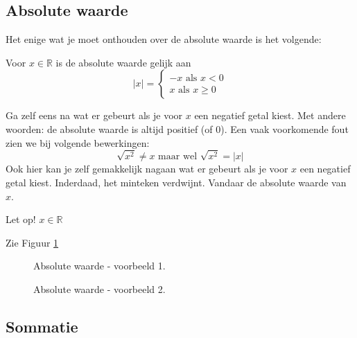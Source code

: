\subsection{Absolute waarde}
Het enige wat je moet onthouden over de absolute waarde is het volgende:

\begin{definitie}
	Voor $x \in \mathbb{R}$ is de absolute waarde gelijk aan 
	\begin{equation*}
	|x| = \begin{cases}
	-x \text{ als } x<0 \\
	x \text{ als } x\ge 0 
	\end{cases}
	\end{equation*}
\end{definitie}

Ga zelf eens na wat er gebeurt als je voor $x$ een negatief getal kiest.
Met andere woorden: de absolute waarde is altijd positief (of 0).
Een vaak voorkomende fout zien we bij volgende bewerkingen:
\begin{equation*}
\sqrt{x^2}\ne x \text{ maar wel } \sqrt{x^2}=|x|
\end{equation*}
Ook hier kan je zelf gemakkelijk nagaan wat er gebeurt als je voor $x$ een negatief getal kiest. Inderdaad, het minteken verdwijnt. Vandaar de absolute waarde van $x$.

\begin{opmerking}
Let op! $x \in \mathbb{R}$	
\end{opmerking}

\begin{voorbeeld}
Zie Figuur \ref{fig:absvalue}

\begin{figure}
	\centering	
	
	\caption{Absolute waarde - voorbeeld 1.}
	\label{fig:absvalue}
\end{figure}

\end{voorbeeld}

\begin{voorbeeld}
	
\begin{figure}
	\centering	
		
	\caption{Absolute waarde - voorbeeld 2.}
	\label{fig:absvalue2}
\end{figure}	

\end{voorbeeld}

\subsection{Sommatie}

